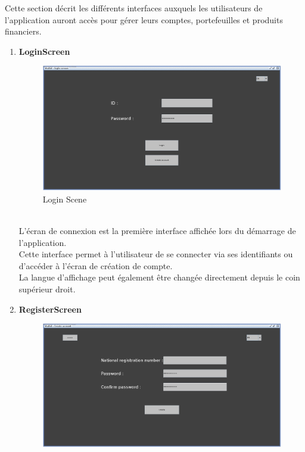\documentclass[../rapport.tex]{subfiles}
\begin{document}
Cette section décrit les différents interfaces auxquels les utilisateurs de l'application auront accès pour gérer leurs comptes, portefeuilles et produits financiers.\\

\begin{enumerate}
\item \textbf{LoginScreen} \\
		\begin{figure}[h!]
				\centering \includegraphics[scale=0.2]{ressources/photos_diagrammes/app1/gui/login.jpg}
				\caption{Login Scene}
		\end{figure}
		\\
L'écran de connexion est la première interface affichée lors du démarrage de l'application.\\
Cette interface permet à l'utilisateur de se connecter via ses identifiants ou d'accéder à l'écran de création de compte.\\
La langue d'affichage peut également être changée directement depuis le coin supérieur droit.
\newpage
\item \textbf{RegisterScreen} \\
		\begin{figure}[h!]
				\centering \includegraphics[scale=0.2]{ressources/photos_diagrammes/app1/gui/createAccount.jpg}

\end{figure}
\end{enumerate}
\end{document}
